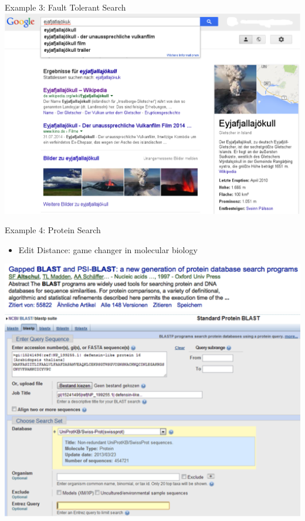 \begin{frame}{Example 3: Fault Tolerant Search}
\     \includegraphics[width=\textwidth]{Images/Introduction/eyjafjallajoekull.png}
\end{frame}

\begin{frame}{Example 4: Protein Search}
  \begin{itemize}
  \item Edit Distance: game changer in molecular biology
  \end{itemize}
\includegraphics[width=\textwidth]{Images/Introduction/blast.png}\\
\includegraphics[width=\textwidth]{Images/Introduction/edit-distance.png}\\
\end{frame}

